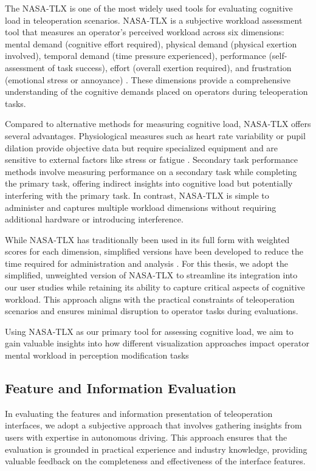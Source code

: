 The \ac{NASA-TLX} is one of the most widely used tools for evaluating cognitive load in teleoperation scenarios. \ac{NASA-TLX} is a subjective workload assessment tool that measures an operator's perceived workload across six dimensions: mental demand (cognitive effort required), physical demand (physical exertion involved), temporal demand (time pressure experienced), performance (self-assessment of task success), effort (overall exertion required), and frustration (emotional stress or annoyance) \cite{hart1988development}. These dimensions provide a comprehensive understanding of the cognitive demands placed on operators during teleoperation tasks.

Compared to alternative methods for measuring cognitive load, \ac{NASA-TLX} offers several advantages. Physiological measures such as heart rate variability or pupil dilation provide objective data but require specialized equipment and are sensitive to external factors like stress or fatigue \cite{wickens2008multiple}. Secondary task performance methods involve measuring performance on a secondary task while completing the primary task, offering indirect insights into cognitive load but potentially interfering with the primary task. In contrast, \ac{NASA-TLX} is simple to administer and captures multiple workload dimensions without requiring additional hardware or introducing interference.

While \ac{NASA-TLX} has traditionally been used in its full form with weighted scores for each dimension, simplified versions have been developed to reduce the time required for administration and analysis \cite{hart2006nasa}. For this thesis, we adopt the simplified, unweighted version of \ac{NASA-TLX} to streamline its integration into our user studies while retaining its ability to capture critical aspects of cognitive workload. This approach aligns with the practical constraints of teleoperation scenarios and ensures minimal disruption to operator tasks during evaluations.

Using \ac{NASA-TLX} as our primary tool for assessing cognitive load, we aim to gain valuable insights into how different visualization approaches impact operator mental workload in perception modification tasks
\subsection{Feature and Information Evaluation}
In evaluating the features and information presentation of teleoperation interfaces, we adopt a subjective approach that involves gathering insights from users with expertise in autonomous driving. This approach ensures that the evaluation is grounded in practical experience and industry knowledge, providing valuable feedback on the completeness and effectiveness of the interface features.

